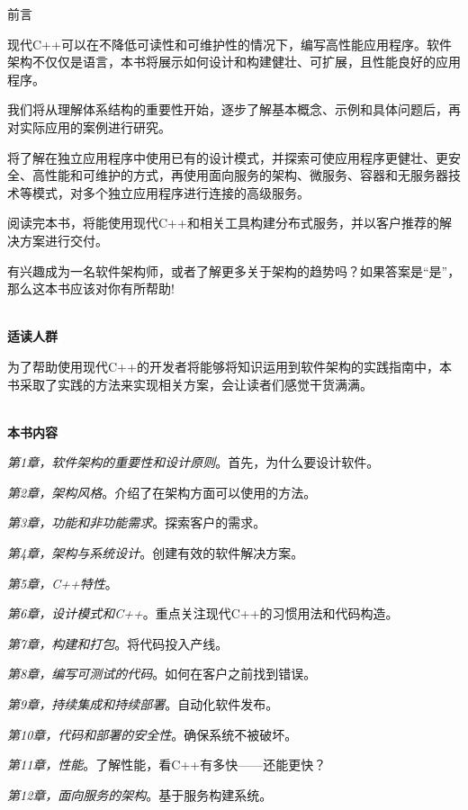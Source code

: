 \begin{flushright}
	 前言
\end{flushright}

现代C++可以在不降低可读性和可维护性的情况下，编写高性能应用程序。软件架构不仅仅是语言，本书将展示如何设计和构建健壮、可扩展，且性能良好的应用程序。

我们将从理解体系结构的重要性开始，逐步了解基本概念、示例和具体问题后，再对实际应用的案例进行研究。

将了解在独立应用程序中使用已有的设计模式，并探索可使应用程序更健壮、更安全、高性能和可维护的方式，再使用面向服务的架构、微服务、容器和无服务器技术等模式，对多个独立应用程序进行连接的高级服务。

阅读完本书，将能使用现代C++和相关工具构建分布式服务，并以客户推荐的解决方案进行交付。

有兴趣成为一名软件架构师，或者了解更多关于架构的趋势吗？如果答案是“是”，那么这本书应该对你有所帮助!

\hspace*{\fill} \\ %
\noindent\textbf{适读人群}

为了帮助使用现代C++的开发者将能够将知识运用到软件架构的实践指南中，本书采取了实践的方法来实现相关方案，会让读者们感觉干货满满。

\hspace*{\fill} \\ %
\textbf{本书内容}

\textit{第1章，软件架构的重要性和设计原则}。首先，为什么要设计软件。

\textit{第2章，架构风格}。介绍了在架构方面可以使用的方法。

\textit{第3章，功能和非功能需求}。探索客户的需求。

\textit{第4章，架构与系统设计}。创建有效的软件解决方案。

\textit{第5章，C++特性}。

\textit{第6章，设计模式和C++}。重点关注现代C++的习惯用法和代码构造。

\textit{第7章，构建和打包}。将代码投入产线。

\textit{第8章，编写可测试的代码}。如何在客户之前找到错误。

\textit{第9章，持续集成和持续部署}。自动化软件发布。

\textit{第10章，代码和部署的安全性}。确保系统不被破坏。

\textit{第11章，性能}。了解性能，看C++有多快——还能更快？

\textit{第12章，面向服务的架构}。基于服务构建系统。

